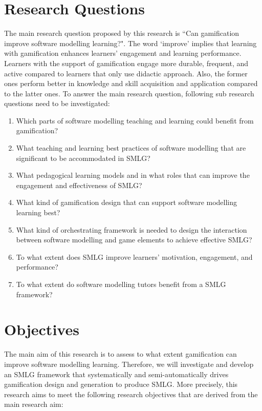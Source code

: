\documentclass[12pt, a4paper]{report}
\begin{document}
{\section{Research Questions}
The main research question proposed by this research is ``Can gamification improve software modelling learning?". The word `improve' implies that learning with gamification enhances learners' engagement and learning performance. Learners with the support of gamification engage more durable, frequent, and active compared to learners that only use didactic approach. Also, the former ones perform better in knowledge and skill acquisition and application compared to the latter ones. To answer the main research question, following sub research questions need to be investigated:
\begin{enumerate}
\item Which parts of software modelling teaching and learning could benefit from gamification?
\item What teaching and learning best practices of software modelling that are significant to be accommodated in SMLG?
\item What pedagogical learning models and in what roles that can improve the engagement and effectiveness of SMLG?
\item What kind of gamification design that can support software modelling learning best? 
\item What kind of orchestrating framework is needed to design the interaction between software modelling and game elements to achieve effective SMLG?
\item To what extent does SMLG improve learners' motivation, engagement, and performance?
\item To what extent do software modelling tutors benefit from a SMLG framework?
\end{enumerate}

\section{Objectives}
\label{Objectives}
The main aim of this research is to assess to what extent gamification can improve software modelling learning. Therefore, we will investigate and develop an SMLG framework that systematically and semi-automatically drives gamification design and generation to produce SMLG. More precisely, this research aims to meet the following research objectives that are derived from the main research aim:

}
\end{document}
